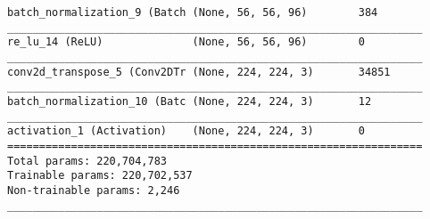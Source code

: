 \begin{lstlisting}[caption={AlexNet \ac{VAE} Decoder},captionpos=b,basicstyle=\tiny, label={lst:alexnet-vae-decoder}]
batch_normalization_9 (Batch (None, 56, 56, 96)        384
_________________________________________________________________
re_lu_14 (ReLU)              (None, 56, 56, 96)        0
_________________________________________________________________
conv2d_transpose_5 (Conv2DTr (None, 224, 224, 3)       34851
_________________________________________________________________
batch_normalization_10 (Batc (None, 224, 224, 3)       12
_________________________________________________________________
activation_1 (Activation)    (None, 224, 224, 3)       0
=================================================================
Total params: 220,704,783
Trainable params: 220,702,537
Non-trainable params: 2,246
_________________________________________________________________
\end{lstlisting}